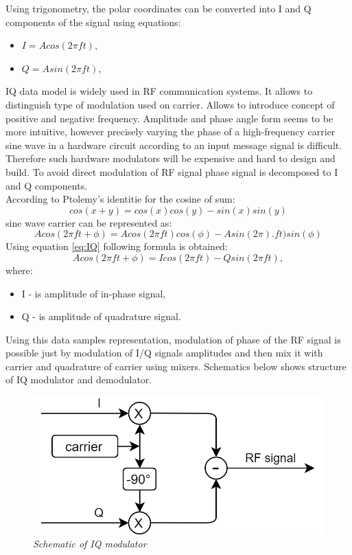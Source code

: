 \documentclass[en,printmode]{mgr}
\begin{document}
		\newpage
		Using trigonometry, the polar coordinates can be converted into I and Q components of the signal using
		equations:
		\begin{itemize}
			\item $I = A cos\left(2\pi f t\right)$, \label{eq:IQ}
			\item $Q = A sin\left(2\pi f t\right)$,
		\end{itemize}
		
		IQ data model is widely used in RF communication systems. It allows to distinguish type of modulation used 
		on carrier. Allows to introduce concept of positive and negative frequency. Amplitude and phase angle form
		seems to be more intuitive, however precisely varying the phase of a high-frequency carrier sine wave in a
		hardware circuit according to an input message signal is difficult. Therefore such hardware modulators will
		be expensive and hard to design and build. To avoid direct modulation of RF signal phase signal is decomposed
		to I and Q components.
		\\
		
		According to Ptolemy’s identitie for the cosine of sum:
		\[
			cos\left(x+y\right) = 
			cos\left(x\right)  cos\left(y\right) - sin\left(x\right) sin\left(y\right)
		\] 
		sine wave carrier can be represented as:
		\[
			Acos\left(2\pi ft + \phi\right) = 
			Acos\left(2\pi ft\right)cos\left(\phi\right) - Asin\left(2\pi\right). ft)sin(\phi)
		\]
		Using equation \ref{eq:IQ} following formula is obtained:
		\[
			Acos\left(2\pi ft + \phi\right) = 
			I cos\left(2\pi f t\right) - Q sin\left(2\pi f t\right),
		\]
		where:
		\begin{itemize}
			\item I - is amplitude of in-phase signal,
			\item Q - is amplitude of quadrature signal.
		\end{itemize}
		
		Using this data samples representation, modulation of phase of the RF signal is possible just by modulation of
		I/Q signals amplitudes and then mix it with carrier and quadrature of carrier using mixers. Schematics below 
		shows structure of IQ modulator and demodulator.
		
		\begin{figure}[!htb]
    		\centering
   			\includegraphics[width=\textwidth]{images/iqmod.png}
    		\caption{\textit{Schematic of IQ modulator}}
    		\label{fig:polarplot}
		\end{figure}
		
\end{document}

